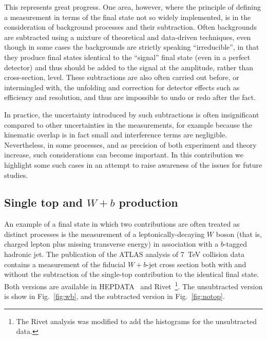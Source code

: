 \documentclass[11pt]{cernrep}
\begin{document}
This represents great progress. One area, however, where the principle of defining a measurement in terms of the final state
not so widely implemented, is in the consideration of background processes and their subtraction. 
Often backgrounds are subtracted using a mixture of theoretical and data-driven techniques, 
even though in some cases the backgrounds are strictly speaking ``irreducible'', in that they produce final states 
identical to the ``signal'' final state (even in a perfect detector) and thus should be added to the signal 
at the amplitude, rather than cross-section, level. These subtractions are also often carried out before, or intermingled with, 
the unfolding and correction for detector effects such as efficiency and resolution, and thus are impossible to
undo or redo after the fact. 

In practice, the uncertainty introduced by such subtractions is often insignificant compared to other uncertainties in the measurements, 
for example because the kinematic overlap
is in fact small and interference terms are negligible. Nevertheless, in some processes, and as precision of both experiment
and theory increase, such considerations can become important. In this contribution we highlight some such cases in an attempt 
to raise awareness of the issues for future studies. 

\subsection{Single top and $W+b$ production}

An example of a final state in which two contributions are often treated as distinct processes is the measurement of a 
leptonically-decaying $W$ boson (that is, charged lepton plus missing transverse energy) in association with a $b$-tagged hadronic jet. 
The publication of the ATLAS analysis of 7~TeV collision data\cite{Aad:2013vka} contains a measurement of the fiducial $W+b$-jet 
cross section both with and without the subtraction of the single-top contribution to the identical final state. Both
versions are available in HEPDATA~\cite{hepdata} and Rivet~\cite{Buckley:2010ar}\footnote{The Rivet analysis was modified to add the histograms 
for the unsubtracted data.}. 
The unsubtracted version is show in Fig.~\ref{fig:wb}, and the subtracted version in Fig.~\ref{fig:notop}. 
\end{document}

